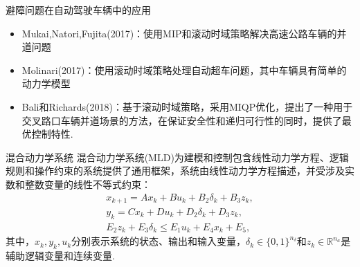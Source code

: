 \documentclass[notheorems,11pt]{beamer}
\theoremstyle{plain}
\numberwithin{theorem}{section}
\numberwithin{lemma}{section}
\numberwithin{corollary}{section}
\theoremstyle{example}
\begin{document}
\begin{frame}{避障问题在自动驾驶车辆中的应用}
\begin{itemize}
  \item Mukai,Natori,Fujita(2017)：使用MIP和滚动时域策略解决高速公路车辆的并道问题
  \item Molinari(2017)：使用滚动时域策略处理自动超车问题，其中车辆具有简单的动力学模型
  \item Bali和Richards(2018)：基于滚动时域策略，采用MIQP优化，提出了一种用于交叉路口车辆并道场景的方法，在保证安全性和递归可行性的同时，提供了最优控制特性.
\end{itemize}
\end{frame}

\begin{frame}{混合动力学系统}
  混合动力学系统(MLD)为建模和控制包含线性动力学方程、逻辑规则和操作约束的系统提供了通用框架，系统由线性动力学方程描述，并受涉及实数和整数变量的线性不等式约束：
  \begin{subequations}
    \begin{gather}
      x_{k+1}=Ax_k+Bu_k+B_2\delta_k+B_3z_k, \label{26a}\\
      y_k=Cx_k+Du_k+D_2\delta_k+D_3z_k, \\
      E_2z_k+E_3\delta_k\leqslant E_1u_k+E_4x_k+E_5,
    \end{gather}
  \end{subequations}
  其中，$x_k,y_k,u_k$分别表示系统的状态、输出和输入变量，$\delta_k\in\{0,1\}^{n_\delta}$和$z_k\in\mathbb{R}^{n_a}$是辅助逻辑变量和连续变量.
\end{frame}
\end{document}

